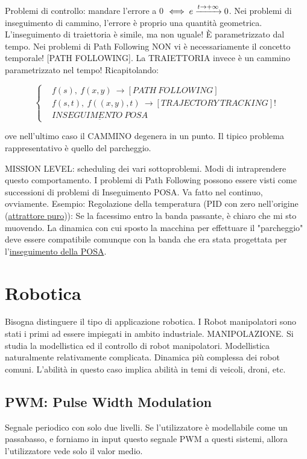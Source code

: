 Problemi di controllo: mandare l'errore a 0 $\iff e \tendsto{t\to+\infty} 0$. Nei problemi di inseguimento di cammino, l'errore è proprio una quantità geometrica. L'inseguimento di traiettoria è simile, ma non uguale! \`E parametrizzato dal tempo. Nei problemi di Path Following NON vi è necessariamente il concetto temporale! [PATH FOLLOWING]. La TRAIETTORIA invece è un cammino parametrizzato nel tempo! Ricapitolando:

\[
	\left\{
	\begin{aligned}
	&f(s),\ f(x,y)\ \rightarrow [PATH\ FOLLOWING]\\
	&f(s,t),\ f((x,y),t)\ \rightarrow [TRAJECTORY\ TRACKING]!\\
	&\underline{INSEGUIMENTO\ POSA}
	\end{aligned}
	\right.
\]

ove nell'ultimo caso il CAMMINO degenera in un punto. Il tipico problema rappresentativo è quello del parcheggio.

MISSION LEVEL: scheduling dei vari sottoproblemi. Modi di intraprendere questo comportamento. I problemi di Path Following possono essere visti come successioni di problemi di Inseguimento POSA. Va fatto nel continuo, ovviamente. Esempio: Regolazione della temperatura (PID con zero nell'origine (\underline{attrattore puro})): Se la facessimo entro la banda passante, è chiaro che mi sto muovendo. La dinamica con cui sposto la macchina per effettuare il "parcheggio" deve essere compatibile comunque con la banda che era stata progettata per l'\underline{inseguimento della POSA}.

\section{Robotica}

Bisogna distinguere il tipo di applicazione robotica. I Robot manipolatori sono stati i primi ad essere impiegati in ambito industriale. MANIPOLAZIONE. Si studia la modellistica ed il controllo di robot manipolatori. Modellistica naturalmente relativamente complicata. Dinamica più complessa dei robot comuni. L'abilità in questo caso implica abilità in temi di veicoli, droni, etc. 

\subsection{PWM: Pulse Width Modulation}

Segnale periodico con solo due livelli. Se l'utilizzatore è modellabile come un passabasso, e forniamo in input questo segnale PWM a questi sistemi, allora l'utilizzatore vede solo il valor medio. 

